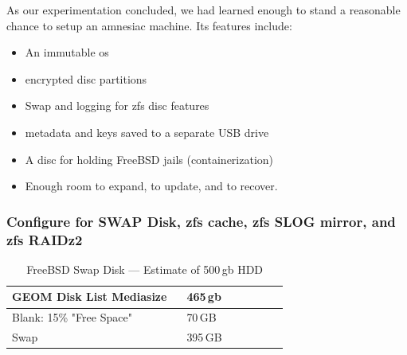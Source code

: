 
As our experimentation concluded, we had learned enough to stand a reasonable chance to setup an \gls{amnesiac} machine.  Its features include:

\begin{itemize}
\item An immutable \gls{os}
\item  {} \Gls{encrypt}ed disc partitions
\item Swap and logging for \gls{zfs} disc features
\item  \Gls{metadata} and keys saved to a separate USB drive
\item A disc for holding FreeBSD jails (containerization)
\item Enough room to expand, to update, and to recover.
\end{itemize}

\subsubsection{Configure for SWAP Disk, \gls{zfs}   \Gls{cache}, \gls{zfs} SLOG \Gls{mirror}, and \gls{zfs} RAIDz2}

\begin{table} \centering \caption{FreeBSD Swap Disk — Estimate of 500\,\gls{gb} HDD} \label{tab:freebsdswapdisc} \begin{tabular}{@{}p{0.60\linewidth} p{0.35\linewidth}@{}} \toprule GEOM Disk List Mediasize & 465\,\gls{gb} \\ \midrule Blank: 15\% "Free Space" & 70\,GB \\ Swap & 395\,GB \\ \bottomrule \end{tabular} \end{table}

